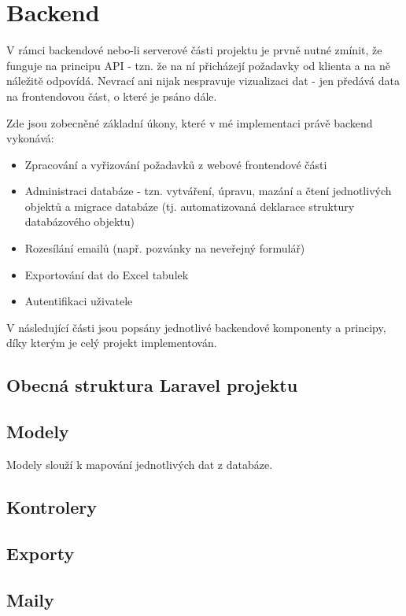 \section{Backend}
	V rámci backendové nebo-li serverové části projektu je prvně nutné zmínit, že funguje na principu API - tzn. že na ní přicházejí požadavky od klienta a na ně náležitě odpovídá. Nevrací ani nijak nespravuje vizualizaci dat - jen předává data na frontendovou část, o které je psáno dále.
	
	Zde jsou zobecněné základní úkony, které v mé implementaci právě backend vykonává:
	
	\begin{itemize}
		\item Zpracování a vyřizování požadavků z webové frontendové části
		\item Administraci databáze - tzn. vytváření, úpravu, mazání a čtení jednotlivých objektů a migrace databáze (tj. automatizovaná deklarace struktury databázového objektu)
		\item Rozesílání emailů (např. pozvánky na neveřejný formulář)
		\item Exportování dat do Excel tabulek
		\item Autentifikaci uživatele
	\end{itemize}
	 
	V následující části jsou popsány jednotlivé backendové komponenty a principy, díky kterým je celý projekt implementován.
	
	\subsection{Obecná struktura Laravel projektu}

	\subsection{Modely}
	Modely slouží k mapování jednotlivých dat z databáze. 
			
	\subsection{Kontrolery}
	
	\subsection{Exporty}
	
	\subsection{Maily}
	

